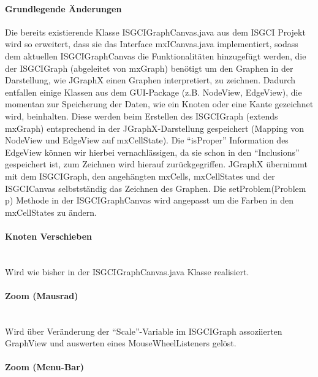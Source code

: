 \documentclass[10pt,a4paper]{article}
\begin{document}
\paragraph{Grundlegende Änderungen}
Die bereits existierende Klasse ISGCIGraphCanvas.java aus dem ISGCI Projekt wird so erweitert, dass sie das Interface mxICanvas.java implementiert, sodass dem aktuellen ISGCIGraphCanvas die Funktionalitäten hinzugefügt werden, die der ISGCIGraph (abgeleitet von mxGraph) benötigt um den Graphen in der Darstellung, wie JGraphX einen Graphen interpretiert, zu zeichnen. 
Dadurch entfallen einige Klassen aus dem GUI-Package (z.B. NodeView, EdgeView), die momentan zur Speicherung der Daten, wie ein Knoten oder eine Kante gezeichnet wird, beinhalten. Diese werden beim Erstellen des ISGCIGraph (extends mxGraph) entsprechend in der JGraphX-Darstellung gespeichert (Mapping von NodeView und EdgeView auf mxCellState). Die "`isProper"' Information des EdgeView können wir hierbei vernachlässigen, da sie schon in den "`Inclusions"' gespeichert ist, zum Zeichnen wird hierauf zurückgegriffen. 
JGraphX übernimmt mit dem ISGCIGraph, den angehängten mxCells, mxCellStates und der ISGCICanvas selbstständig das Zeichnen des Graphen.
Die setProblem(Problem p) Methode in der ISGCIGraphCanvas wird angepasst um die Farben in den mxCellStates zu ändern.

\paragraph{Knoten Verschieben}\ \\ 

Wird wie bisher in der ISGCIGraphCanvas.java Klasse realisiert.

\paragraph{Zoom (Mausrad)}\ \\ 

Wird über Veränderung der "`Scale"'-Variable im ISGCIGraph assoziierten GraphView und auswerten eines MouseWheelListeners gelöst.

\paragraph{Zoom (Menu-Bar)}\ \\ 
\end{document}
